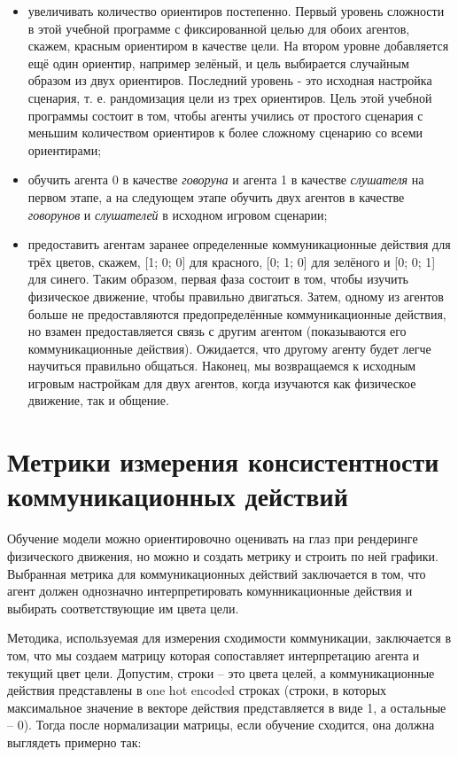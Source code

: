 \begin{itemize}
    \item увеличивать количество ориентиров постепенно. Первый уровень сложности в этой учебной программе с фиксированной целью для обоих агентов, скажем, красным ориентиром в качестве цели. На втором уровне добавляется ещё один ориентир, например зелёный, и цель выбирается случайным образом из двух ориентиров. Последний уровень - это исходная настройка сценария, т. е. рандомизация цели из трех ориентиров. Цель этой учебной программы состоит в том, чтобы агенты учились от простого сценария с меньшим количеством ориентиров к более сложному сценарию со всеми ориентирами;
    \item обучить агента 0 в качестве \textit{говоруна} и агента 1 в качестве \textit{слушателя} на первом этапе, а на следующем этапе обучить двух агентов в качестве \textit{говорунов} и \textit{слушателей} в исходном игровом сценарии;
    \item предоставить агентам заранее определенные коммуникационные действия для трёх цветов, скажем, [1; 0; 0] для красного, [0; 1; 0] для зелёного и [0; 0; 1] для синего. Таким образом, первая фаза состоит в том, чтобы изучить физическое движение, чтобы правильно двигаться. Затем, одному из агентов больше не предоставляются предопределённые коммуникационные действия, но взамен предоставляется связь с другим агентом (показываются его коммуникационные действия). Ожидается, что другому агенту будет легче научиться правильно общаться. Наконец, мы возвращаемся к исходным игровым настройкам для двух агентов, когда изучаются как физическое движение, так и общение.
\end{itemize} %


\section{Метрики измерения консистентности коммуникационных действий}

Обучение модели можно ориентировочно оценивать на глаз при рендеринге физического движения, но можно и создать метрику и строить по ней графики. Выбранная метрика для коммуникационных действий заключается в том, что агент должен однозначно интерпретировать комунникационные действия и выбирать соответствующие им цвета цели.

Методика, используемая для измерения сходимости коммуникации, заключается в том, что мы создаем матрицу которая сопоставляет интерпретацию агента и текущий цвет цели. Допустим, строки – это цвета целей, а коммуникационные действия представлены в one hot encoded строках (строки, в которых максимальное значение в векторе действия представляется в виде 1, а остальные – 0). Тогда после нормализации матрицы, если обучение сходится, она должна выглядеть примерно так:

